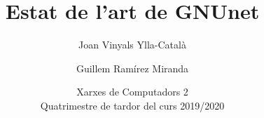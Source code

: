 
\title[GNUnet]{Estat de l'art de GNUnet}

\author[J. Vinyals, G. Ramírez]{Joan Vinyals Ylla-Català  \and  Guillem Ramírez Miranda}


\date[Xarxes de Computadors 2]{
  Xarxes de Computadors 2 \\ 
  Quatrimestre de tardor del curs 2019/2020}


\frame{\titlepage}
